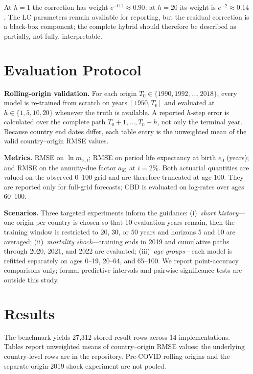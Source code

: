 \documentclass[11pt,a4paper]{article}
\begin{document}
At $h = 1$ the correction has weight $e^{-0.1} \approx 0.90$; at $h = 20$ its weight is $e^{-2} \approx 0.14$. The LC parameters remain available for reporting, but the residual correction is a black-box component; the complete hybrid should therefore be described as partially, not fully, interpretable.

\section{Evaluation Protocol}
\label{sec:protocol}

\textbf{Rolling-origin validation.} For each origin $T_0 \in \{1990, 1992, \ldots, 2018\}$, every model is re-trained from scratch on years $[1950, T_0]$ and evaluated at $h \in \{1, 5, 10, 20\}$ whenever the truth is available. A reported $h$-step error is calculated over the complete path $T_0{+}1,\ldots,T_0{+}h$, not only the terminal year. Because country end dates differ, each table entry is the unweighted mean of the valid country--origin RMSE values.

\textbf{Metrics.} RMSE on $\ln m_{x,t}$; RMSE on period life expectancy at birth $e_0$ (years); and RMSE on the annuity-due factor $\ddot{a}_{65}$ at $i=2\%$. Both actuarial quantities are valued on the observed 0--100 grid and are therefore truncated at age 100. They are reported only for full-grid forecasts; CBD is evaluated on log-rates over ages 60--100.

\textbf{Scenarios.} Three targeted experiments inform the guidance: (i)~\emph{short history}---one origin per country is chosen so that 10 evaluation years remain, then the training window is restricted to 20, 30, or 50 years and horizons 5 and 10 are averaged; (ii)~\emph{mortality shock}---training ends in 2019 and cumulative paths through 2020, 2021, and 2022 are evaluated; (iii)~\emph{age groups}---each model is refitted separately on ages 0--19, 20--64, and 65--100. We report point-accuracy comparisons only; formal predictive intervals and pairwise significance tests are outside this study.

\section{Results}
\label{sec:results}

The benchmark yields 27{,}312 stored result rows across 14 implementations. Tables report unweighted means of country--origin RMSE values; the underlying country-level rows are in the repository. Pre-COVID rolling origins and the separate origin-2019 shock experiment are not pooled.
\end{document}
